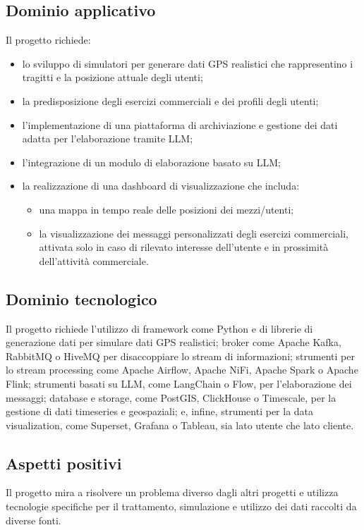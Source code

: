 \documentclass[italian, 12pt]{article}
\begin{document}
\subsection{Dominio applicativo}
Il progetto richiede:
\begin{itemize}
    \item lo sviluppo di simulatori per generare dati GPS realistici che rappresentino i tragitti e la posizione attuale degli utenti;
    \item la predisposizione degli esercizi commerciali e dei profili degli utenti;
    \item l'implementazione di una piattaforma di archiviazione e gestione dei dati adatta per l'elaborazione tramite LLM;
    \item l'integrazione di un modulo di elaborazione basato su LLM;
    \item la realizzazione di una dashboard di visualizzazione che includa:
    \begin{itemize}
        \item una mappa in tempo reale delle posizioni dei mezzi/utenti;
        \item la visualizzazione dei messaggi personalizzati degli esercizi commerciali, attivata solo in caso di rilevato interesse dell'utente e in prossimità dell'attività commerciale.
    \end{itemize}
\end{itemize}

\subsection{Dominio tecnologico}
Il progetto richiede l'utilizzo di framework come Python e di librerie di generazione dati per simulare dati GPS realistici; broker come Apache Kafka, RabbitMQ o HiveMQ per disaccoppiare lo stream di informazioni; strumenti per lo stream processing come Apache Airflow, Apache NiFi, Apache Spark o Apache Flink; strumenti basati su LLM, come LangChain o Flow, per l'elaborazione dei messaggi; database e storage, come PostGIS, ClickHouse o Timescale, per la gestione di dati timeseries e geospaziali; e, infine, strumenti per la data visualization, come Superset, Grafana o Tableau, sia lato utente che lato cliente.

\subsection{Aspetti positivi}
Il progetto mira a risolvere un problema diverso dagli altri progetti e utilizza tecnologie specifiche per il trattamento, simulazione e utilizzo dei dati raccolti da diverse fonti.
\end{document}
